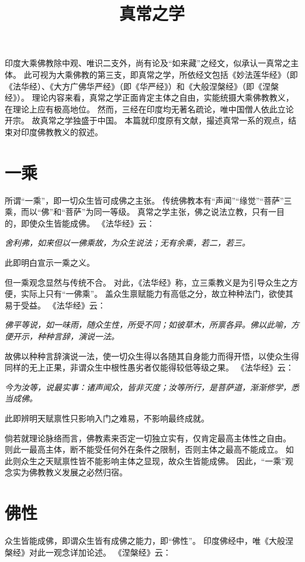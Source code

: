 \documentclass[11pt]{article}
\title{真常之学}
\date{}
\begin{document}
  \maketitle

  \linenumbers

印度大乘佛教除中观、唯识二支外，尚有论及“如来藏”之经文，似承认一真常之主体。
此可视为大乘佛教的第三支，即真常之学，所依经文包括《妙法莲华经》（即《法华经）、《大方广佛华严经》（即《华严经》）和《大般涅槃经》（即《涅槃经》）。
理论内容来看，真常之学正面肯定主体之自由，实能统摄大乘佛教教义，在理论上应有极高地位。
然而，三经在印度均无著名疏论，唯中国僧人依此立论开宗。
故真常之学独盛于中国。
本篇就印度原有文献，撮述真常一系的观点，结束对印度佛教教义的叙述。

\section{一乘}
所谓“一乘”，即一切众生皆可成佛之主张。
传统佛教本有“声闻”“缘觉”“菩萨”三乘，而以“佛”和“菩萨”为同一等级。
真常之学主张，佛之说法立教，只有一目的，即使众生皆能成佛。
《法华经》云：

\textit{舍利弗，如来但以一佛乘故，为众生说法；无有余乘，若二，若三。}

此即明白宣示一乘之义。

\par

但一乘观念显然与传统不合。
对此，《法华经》称，立三乘教义是为引导众生之方便，实际上只有“一佛乘”。
盖众生禀赋能力有高低之分，故立种种法门，欲使其易于受益。
《法华经》云：

\textit{佛平等说，如一味雨，随众生性，所受不同；如彼草木，所禀各异。佛以此喻，方便开示，种种言辞，演说一法。}

故佛以种种言辞演说一法，使一切众生得以各随其自身能力而得开悟，以使众生得同样的无上正果，非谓众生中根性愚劣者仅能得较低等级之果。
《法华经》云：

\textit{今为汝等，说最实事：诸声闻众，皆非灭度；汝等所行，是菩萨道，渐渐修学，悉当成佛。}

此即辨明天赋禀性只影响入门之难易，不影响最终成就。

\par

倘若就理论脉络而言，佛教素来否定一切独立实有，仅肯定最高主体性之自由。
则此一最高主体，断不能受任何外在条件之限制，否则主体之最高不能成立。
如此则众生之天赋禀性皆不能影响主体之显现，故众生皆能成佛。
因此，“一乘”观念实为佛教教义发展之必然归宿。

\section{佛性}
众生皆能成佛，即谓众生皆有成佛之能力，即“佛性”。
印度佛经中，唯《大般涅槃经》对此一观念详加论述。
《涅槃经》云：
\end{document}
